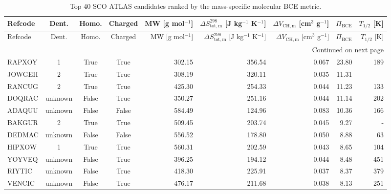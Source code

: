 \begin{scriptsize}
\begin{longtable}{l c c c r r r r r}
\caption{Top 40 SCO ATLAS candidates ranked by the mass-specific molecular BCE metric.}\label{tab:bce_top40_candidates}\\
\toprule
Refcode & Dent. & Homo. & Charged & \shortstack{MW \\[1pt] [g mol$^{-1}$]} & \shortstack{$\Delta S_{\mathrm{tot,m}}^{298}$ \\[1pt] [J kg$^{-1}$ K$^{-1}$]} & \shortstack{$\Delta V_{\mathrm{CH,m}}$ \\[1pt] [cm$^3$ g$^{-1}$]} & $\Pi_{\mathrm{BCE}}$ & \shortstack{$T_{1/2}$ \\[1pt] [K]} \\
\midrule
\endfirsthead
\toprule
Refcode & Dent. & Homo. & Charged & \shortstack{MW \\[1pt] [g mol$^{-1}$]} & \shortstack{$\Delta S_{\mathrm{tot,m}}^{298}$ \\[1pt] [J kg$^{-1}$ K$^{-1}$]} & \shortstack{$\Delta V_{\mathrm{CH,m}}$ \\[1pt] [cm$^3$ g$^{-1}$]} & $\Pi_{\mathrm{BCE}}$ & \shortstack{$T_{1/2}$ \\[1pt] [K]} \\
\midrule
\endhead
\midrule
\multicolumn{9}{r}{Continued on next page} \\
\midrule
\endfoot
\bottomrule
\endlastfoot
RAPXOY & 1 & True & True & 302.15 & 356.54 & 0.067 & 23.80 & 189 \\
JOWGEH & 2 & True & True & 308.19 & 320.11 & 0.035 & 11.31 & - \\
RANCUG & 2 & True & True & 425.30 & 254.33 & 0.044 & 11.23 & 133 \\
DOQRAC & unknown & False & True & 350.27 & 251.16 & 0.044 & 11.14 & 202 \\
ADAQUU & unknown & False & False & 584.49 & 124.96 & 0.083 & 10.36 & 166 \\
BAKGUR & 2 & True & True & 509.45 & 203.74 & 0.045 & 9.27 & - \\
DEDMAC & unknown & False & False & 556.52 & 178.80 & 0.050 & 8.88 & 63 \\
HIPXOW & 1 & True & True & 560.31 & 202.59 & 0.043 & 8.65 & 104 \\
YOYVEQ & unknown & False & True & 396.25 & 194.12 & 0.044 & 8.48 & 451 \\
RIYTIC & unknown & False & True & 418.30 & 225.91 & 0.037 & 8.37 & 379 \\
VENCIC & unknown & False & True & 476.17 & 211.68 & 0.038 & 8.13 & 251 \\

\end{longtable}
\end{scriptsize}
